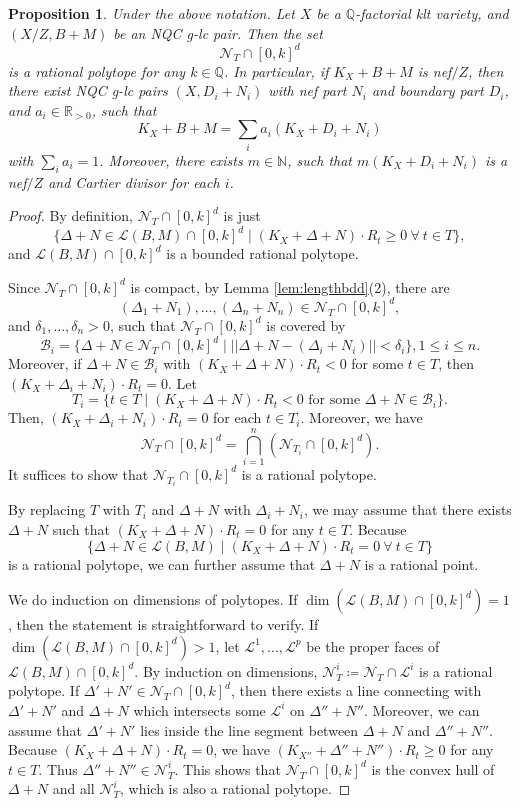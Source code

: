 \documentclass[11pt]{amsart}
\newcommand{\Rr}{\mathbb{R}}
\newcommand{\Qq}{\mathbb{Q}}
\newcommand{\Nn}{\mathbb{N}}
\newcommand{\Bb}{\mathcal{B}}
\newcommand{\Ll}{\mathcal{L}}
\newcommand{\nN}{\mathcal{N}}
\newtheorem{proposition}[theorem]{Proposition}
\begin{document}
\begin{proposition}\label{le: decomposition to nef Cartier divisors} Under the above notation. Let $X$ be a $\Qq$-factorial klt variety, and $(X/Z,B+M)$ be an NQC g-lc pair. Then the set 
	\[
	\nN_{T} \cap [0, k]^d
	\]
	is a rational polytope for any $k\in\Qq$. In particular, if $K_X+B+M$ is nef$/Z$, then there exist NQC g-lc pairs $(X, D_i+N_i)$ with nef part $N_i$ and boundary part $D_i$, and $a_i \in \Rr_{>0}$,  such that 
	\[
	K_X+B+M=\sum_i a_i (K_X+D_i+N_i)\] with $\sum_{i} a_i=1$. Moreover, there exists $m\in \Nn$, such that $m(K_X+D_i+N_i)$ is a nef$/Z$ and Cartier divisor for each $i$.
\end{proposition}
\begin{proof}
 By definition, $\nN_{T} \cap [0, k]^d$ is just 
 \[
\{\Delta+N\in \Ll(B,M) \cap [0, k]^d \mid (K_X+\Delta+N)\cdot R_t\ge0~\forall~ t\in T\},
 \] and $\Ll(B,M) \cap [0, k]^d$ is a bounded rational polytope. 
	
	Since $\nN_{T} \cap [0, k]^d$ is compact, by Lemma \ref{lem:lengthbdd}(2), there are 
	\[
	(\Delta_1+N_1),\ldots,(\Delta_n+N_n)\in \nN_{T}\cap [0, k]^d,
	\] and $\delta_1,\ldots,\delta_n>0$, such that $\nN_{T} \cap [0, k]^d$ is covered by 
	\[
	\Bb_i=\{\Delta+N \in \nN_{T} \cap [0, k]^d \mid ||\Delta+N-(\Delta_i+N_i)||<\delta_i\}, 1 \leq i \leq n.
	\] Moreover, if $\Delta+N\in\Bb_i$ with $(K_X+\Delta+N)\cdot R_t<0$ for some $t\in T$, then  $(K_X+\Delta_i+N_i)\cdot R_t=0$. Let
	\[
	T_i=\{t\in T \mid (K_X+\Delta+N)\cdot R_t<0 \text{~for some~}\Delta+N\in \Bb_i\}.
	\]
	Then, $(K_X+\Delta_i+N_i)\cdot R_t=0$ for each $t\in T_i$. Moreover, we have 
	\[
	\nN_T \cap [0, k]^d=\bigcap_{i=1}^n (\nN_{T_i}\cap [0, k]^d).
	\] It suffices to show that $\nN_{T_i}\cap [0, k]^d$ is a rational polytope. 
	
	By replacing $T$ with $T_i$ and $\Delta+N$ with $\Delta_i+N_i$, we may assume that there exists $\Delta+N$ such that $(K_X+\Delta+N)\cdot R_t=0$ for any $t\in T$. Because 
	\[
	\{\Delta+N \in \Ll(B,M) \mid (K_X+\Delta+N) \cdot R_t = 0 ~\forall~t\in T\}
	\] is a rational polytope, we can further assume that $\Delta+N$ is a rational point. 
	
	We do induction on dimensions of polytopes. If $\dim (\Ll(B, M)\cap [0, k]^d)=1$, then the statement is straightforward to verify. If $\dim(\Ll(B, M)\cap [0, k]^d)>1$, let $\Ll^1,\ldots,\Ll^p$ be the proper faces of $\Ll(B, M)\cap [0, k]^d$. By induction on dimensions, $\nN_{T}^i \coloneqq \nN_{T}\cap \Ll^i$ is a rational polytope. If $\Delta' + N' \in \nN_T\cap [0, k]^d$, then there exists a line connecting with  $\Delta' + N'$ and $\Delta+ N$ which intersects some $\Ll^i$ on $\Delta'' + N''$. Moreover, we can assume that $\Delta' + N'$ lies inside the line segment between $\Delta+N$ and $\Delta'' + N''$.  Because $(K_X+\Delta+N)\cdot R_t=0$, we have $(K_{X''}+\Delta''+N'')\cdot R_t \geq 0$ for any $t\in T$. Thus $\Delta''+N'' \in \nN_{T}^i$. This shows that $\nN_T\cap [0, k]^d$ is the convex hull of $\Delta+N$ and all $\nN_T^i$, which is also a rational polytope.
\end{proof}
\end{document}
